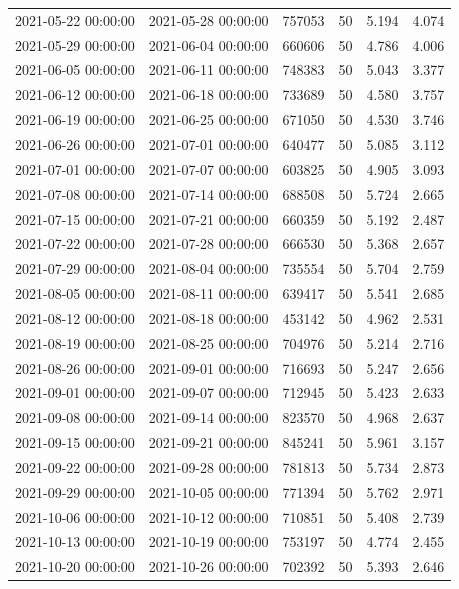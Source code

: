 \begin{tabular}{llrrrr}
2021-05-22 00:00:00 & 2021-05-28 00:00:00 & 757053 & 50 & 5.194 & 4.074 \\
2021-05-29 00:00:00 & 2021-06-04 00:00:00 & 660606 & 50 & 4.786 & 4.006 \\
2021-06-05 00:00:00 & 2021-06-11 00:00:00 & 748383 & 50 & 5.043 & 3.377 \\
2021-06-12 00:00:00 & 2021-06-18 00:00:00 & 733689 & 50 & 4.580 & 3.757 \\
2021-06-19 00:00:00 & 2021-06-25 00:00:00 & 671050 & 50 & 4.530 & 3.746 \\
2021-06-26 00:00:00 & 2021-07-01 00:00:00 & 640477 & 50 & 5.085 & 3.112 \\
2021-07-01 00:00:00 & 2021-07-07 00:00:00 & 603825 & 50 & 4.905 & 3.093 \\
2021-07-08 00:00:00 & 2021-07-14 00:00:00 & 688508 & 50 & 5.724 & 2.665 \\
2021-07-15 00:00:00 & 2021-07-21 00:00:00 & 660359 & 50 & 5.192 & 2.487 \\
2021-07-22 00:00:00 & 2021-07-28 00:00:00 & 666530 & 50 & 5.368 & 2.657 \\
2021-07-29 00:00:00 & 2021-08-04 00:00:00 & 735554 & 50 & 5.704 & 2.759 \\
2021-08-05 00:00:00 & 2021-08-11 00:00:00 & 639417 & 50 & 5.541 & 2.685 \\
2021-08-12 00:00:00 & 2021-08-18 00:00:00 & 453142 & 50 & 4.962 & 2.531 \\
2021-08-19 00:00:00 & 2021-08-25 00:00:00 & 704976 & 50 & 5.214 & 2.716 \\
2021-08-26 00:00:00 & 2021-09-01 00:00:00 & 716693 & 50 & 5.247 & 2.656 \\
2021-09-01 00:00:00 & 2021-09-07 00:00:00 & 712945 & 50 & 5.423 & 2.633 \\
2021-09-08 00:00:00 & 2021-09-14 00:00:00 & 823570 & 50 & 4.968 & 2.637 \\
2021-09-15 00:00:00 & 2021-09-21 00:00:00 & 845241 & 50 & 5.961 & 3.157 \\
2021-09-22 00:00:00 & 2021-09-28 00:00:00 & 781813 & 50 & 5.734 & 2.873 \\
2021-09-29 00:00:00 & 2021-10-05 00:00:00 & 771394 & 50 & 5.762 & 2.971 \\
2021-10-06 00:00:00 & 2021-10-12 00:00:00 & 710851 & 50 & 5.408 & 2.739 \\
2021-10-13 00:00:00 & 2021-10-19 00:00:00 & 753197 & 50 & 4.774 & 2.455 \\
2021-10-20 00:00:00 & 2021-10-26 00:00:00 & 702392 & 50 & 5.393 & 2.646 \\

\end{tabular}
